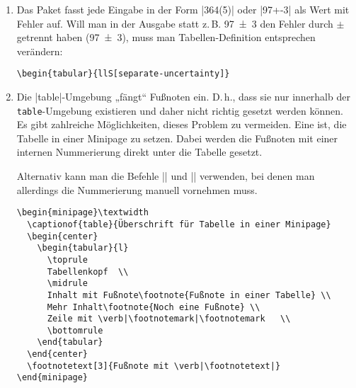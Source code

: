 \begin{enumerate}[label=\alph*)]
\item Das Paket  fasst jede Eingabe in der Form |364(5)| oder |97+-3| als Wert mit Fehler auf. Will man in der Ausgabe statt z.\,B. \num{97(3)} den Fehler durch $\pm$ getrennt haben (\num[separate-uncertainty]{97(3)}), muss man Tabellen-Definition entsprechen verändern:
\begin{lstlisting}
\begin{tabular}{llS[separate-uncertainty]}
\end{lstlisting}

\pagebreak
\item Die |table|-Um\-ge\-bung „fängt“ Fußnoten ein. D.\,h., dass sie nur innerhalb der \verb|table|-Um\-ge\-bung existieren und daher nicht richtig gesetzt werden können.
Es gibt zahlreiche Möglichkeiten, dieses Problem zu vermeiden. Eine ist, die Tabelle in einer Minipage zu setzen. Dabei werden die Fußnoten mit einer internen Nummerierung direkt unter die Tabelle gesetzt.

Alternativ kann man die Befehle |\footnotemark| und |\footnotetext| verwenden, bei denen man allerdings die Nummerierung manuell vornehmen muss.
\begin{lstlisting}
\begin{minipage}\textwidth
  \captionof{table}{Überschrift für Tabelle in einer Minipage}
  \begin{center}
    \begin{tabular}{l}
      \toprule
      Tabellenkopf	\\
      \midrule
      Inhalt mit Fußnote\footnote{Fußnote in einer Tabelle} \\
      Mehr Inhalt\footnote{Noch eine Fußnote} \\
      Zeile mit \verb|\footnotemark|\footnotemark	\\
      \bottomrule
    \end{tabular}
  \end{center}
  \footnotetext[3]{Fußnote mit \verb|\footnotetext|}
\end{minipage}
\end{lstlisting}

\end{enumerate}
